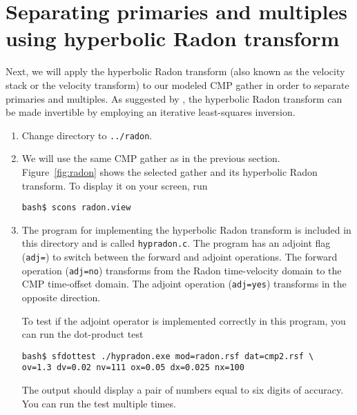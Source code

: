 \lstset{language=python,numbers=left,numberstyle=\tiny,showstringspaces=false}


\section{Separating primaries and multiples using hyperbolic Radon transform}

Next, we will apply the hyperbolic Radon transform (also known as the velocity stack or the velocity transform) to our modeled CMP gather in order to separate primaries and multiples. As suggested by \cite{GEO50-12-27272741}, the hyperbolic Radon transform can be made invertible by employing an iterative least-squares inversion.

\begin{enumerate}

\item Change directory to \texttt{../radon}.


\item We will use the same CMP gather as in the previous section. Figure~\ref{fig:radon} shows the selected gather and its hyperbolic Radon transform. To display it on your screen, run
\begin{verbatim}
bash$ scons radon.view
\end{verbatim}

\item The program for implementing the hyperbolic Radon transform is included in this directory and is called \texttt{hypradon.c}. The program has an adjoint flag (\texttt{adj=}) to switch between the forward and adjoint operations. The forward operation (\texttt{adj=no}) transforms from the Radon time-velocity domain to the CMP time-offset domain. The adjoint operation  (\texttt{adj=yes}) transforms in the opposite direction. 

To test if the adjoint operator is implemented correctly in this program, you can run the dot-product test
\begin{verbatim}
bash$ sfdottest ./hypradon.exe mod=radon.rsf dat=cmp2.rsf \
ov=1.3 dv=0.02 nv=111 ox=0.05 dx=0.025 nx=100
\end{verbatim}
The output should display a pair of numbers equal to six digits of accuracy. You can run the test multiple times.


\end{enumerate}
